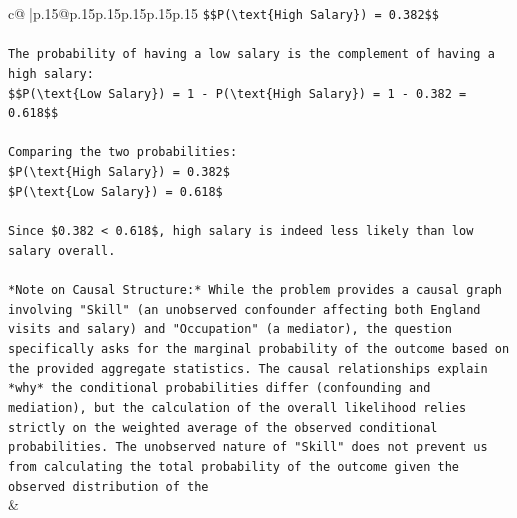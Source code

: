 \documentclass{article}
\begin{document}
{\begin{supertabular}{c@{$\;$}|p{.15\linewidth}@{}p{.15\linewidth}p{.15\linewidth}p{.15\linewidth}p{.15\linewidth}p{.15\linewidth}}
{{{\texttt{\$\$P(\textbackslash{}text\{High Salary\}) = 0.382\$\$} \\
\\ 
\texttt{The probability of having a low salary is the complement of having a high salary:} \\
\texttt{\$\$P(\textbackslash{}text\{Low Salary\}) = 1 {-} P(\textbackslash{}text\{High Salary\}) = 1 {-} 0.382 = 0.618\$\$} \\
\\ 
\texttt{Comparing the two probabilities:} \\
\texttt{\$P(\textbackslash{}text\{High Salary\}) = 0.382\$} \\
\texttt{\$P(\textbackslash{}text\{Low Salary\}) = 0.618\$} \\
\\ 
\texttt{Since \$0.382 < 0.618\$, high salary is indeed less likely than low salary overall.} \\
\\ 
\texttt{*Note on Causal Structure:* While the problem provides a causal graph involving "Skill" (an unobserved confounder affecting both England visits and salary) and "Occupation" (a mediator), the question specifically asks for the marginal probability of the outcome based on the provided aggregate statistics. The causal relationships explain *why* the conditional probabilities differ (confounding and mediation), but the calculation of the overall likelihood relies strictly on the weighted average of the observed conditional probabilities. The unobserved nature of "Skill" does not prevent us from calculating the total probability of the outcome given the observed distribution of the} \\
            }
        }
    }
    & \\ \\


\end{supertabular}}
\end{document}
